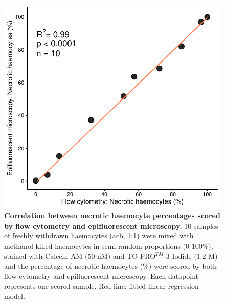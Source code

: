 \begin{figure}[b]
    \centering
    \includegraphics[width=.5\textwidth]{figures/Method development/FCM FM lin reg.pdf}
    \caption{\textbf{Correlation between necrotic haemocyte percentages scored by flow cytometry and epifluorescent microscopy.} 10 samples of freshly withdrawn haemocytes (\acrshort{acb}, 1:1) were mixed with methanol-killed haemocytes in semi-random proportions (0-100\%), stained with Calcein AM (50 nM) and TO-PRO$^{TM}$-3 Iodide (1.2 \micro M) and the percentage of necrotic haemocytes (\%) were scored by both flow cytometry and epifluorescent microscopy. Each datapoint represents one scored sample. Red line: fitted linear regression model.}
    \label{fig:method_val_1}
\end{figure}
